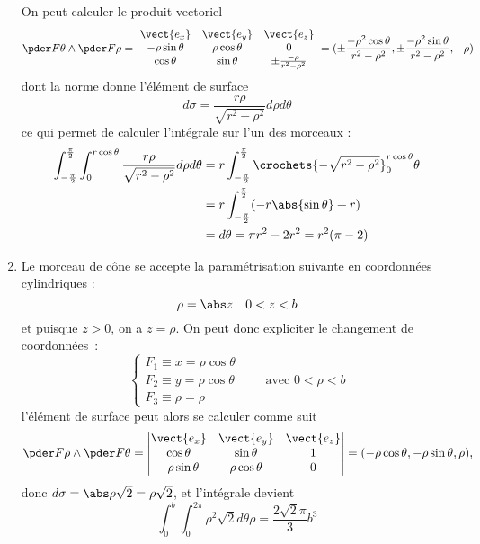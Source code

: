 \begin{enumerate}
On peut calculer le produit vectoriel
\begin{equation*}
\pder F \theta \wedge \pder F \rho =
\begin{vmatrix}
\vect{e_x} & \vect{e_y} & \vect{e_z}\\
-\rho\sin\theta & \rho\cos\theta & 0\\
\cos\theta & \sin\theta & \pm \frac{-\rho}{r^2-\rho^2}
\end{vmatrix} = (\pm\frac{-\rho^2 \cos\theta}{r^2-\rho^2}, \pm
\frac{- \rho^2 \sin\theta}{r^2-\rho^2}, -\rho)
\end{equation*}
dont la norme donne l'élément de surface
\begin{equation*}
d \sigma = \frac{r \rho}{\sqrt{r^2-\rho^2}} d \rho d \theta
\end{equation*}
ce qui permet de calculer l'intégrale sur l'un des morceaux :
\begin{equation*}
\begin{split}
\int_{-\frac\pi2}^{\frac\pi2} \int_0^{r\cos\theta}\frac{r
\rho}{\sqrt{r^2-\rho^2}} d \rho d \theta %
&= r \int_{-\frac\pi2}^{\frac\pi2} \crochets{- \sqrt{r^2-\rho^2}}_0^{r\cos\theta} \theta\\
&= r \int_{-\frac\pi2}^{\frac\pi2} (- r \abs{\sin\theta} + r)\\
	&=d\theta = \pi r^2 - 2 r^2 = r^2 (\pi - 2)
\end{split}
\end{equation*}

\item Le morceau de cône se accepte la paramétrisation suivante en coordonnées cylindriques :
\begin{equation*}
\rho = \abs z \quad 0 < z < b
\end{equation*}
et puisque $z > 0$, on a $z = \rho$. On peut donc expliciter le
changement de coordonnées~:
\begin{equation*}
\begin{cases}
F_1 \equiv x = \rho \cos \theta\\
F_2 \equiv y = \rho \cos \theta\\
F_3 \equiv \rho = \rho
\end{cases} \qquad \text{avec }0 < \rho < b
\end{equation*}
l'élément de surface peut alors se calculer comme suit
\begin{equation*}
\pder F \rho \wedge \pder F \theta = %
\begin{vmatrix}
\vect{e_x} & \vect{e_y} & \vect{e_z}\\
\cos\theta & \sin\theta & 1\\
-\rho \sin\theta & \rho \cos \theta & 0
\end{vmatrix} = (- \rho \cos\theta, - \rho \sin\theta, \rho),
\end{equation*}
donc $d\sigma = \abs \rho \sqrt2 = \rho \sqrt 2$, et l'intégrale devient
\begin{equation*}
\int_0^b \int_0^{2\pi} \rho^2 \sqrt 2 d \theta \rho = \frac {2\sqrt2
\pi}3 b^3
\end{equation*}


\end{enumerate}
